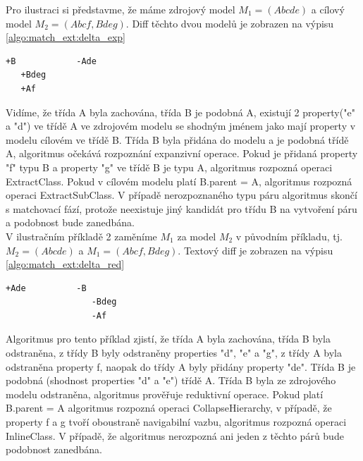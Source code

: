 \documentclass[11pt,twoside,a4paper]{book}
\begin{document}
 Pro ilustraci si představme, že máme zdrojový model $M_1 = (Abcde)$ a cílový
 model $M_2 = (Abcf, Bdeg)$. Diff těchto dvou modelů je zobrazen na výpisu
 \ref{algo:match_ext:delta_exp}

 \begin{lstlisting}[frame=single,caption=Textový diff pro
 expanzivní operaci,label=algo:match_ext:delta_exp]
   +B            -Ade
   +Bdeg          
   +Af
\end{lstlisting}
 
 Vidíme, že třída A byla zachována, třída B je podobná A, existují 2
 property("e" a "d") ve třídě A ve zdrojovém modelu se shodným jménem jako mají
 property v modelu cílovém ve třídě B. Třída B byla přidána do modelu a je
 podobná třídě A, algoritmus očekává rozpoznání expanzivní operace. Pokud je
 přidaná property "f" typu B a property "g" ve třídě B je typu A, algoritmus
 rozpozná operaci ExtractClass. Pokud v cílovém modelu platí B.parent = A,
 algoritmus rozpozná operaci ExtractSubClass.
 V případě nerozpoznaného typu páru algoritmus skončí s matchovací fází, protože
 neexistuje jiný kandidát pro třídu B na vytvoření páru a podobnost bude
 zanedbána.\\
 
 V ilustračním příkladě 2 zaměníme $M_1$
 za model $M_2$ v původním příkladu, tj. $M_2 = (Abcde)$ a $M_1 = (Abcf,
 Bdeg)$. Textový diff je zobrazen na výpisu \ref{algo:match_ext:delta_red}
 
  \begin{lstlisting}[frame=single,caption=Textový diff pro
 reduktivní operaci,label=algo:match_ext:delta_red]
   +Ade          -B            
                 -Bdeg          
                 -Af
\end{lstlisting}
 
 Algoritmus pro tento příklad zjistí, že třída A byla zachována, třída B byla
 odstraněna, z třídy B byly odstraněny properties "d", "e" a "g", z třídy A
 byla odstraněna property f, naopak do třídy A byly přidány property "de". Třída
 B je podobná (shodnost properties "d" a "e") třídě A. Třída B
 byla ze zdrojového modelu odstraněna, algoritmus prověřuje reduktivní operace.
 Pokud platí B.parent = A algoritmus rozpozná operaci CollapseHierarchy, v
 případě, že property f a g tvoří oboustraně navigabilní vazbu, algoritmus
 rozpozná operaci InlineClass. V případě, že algoritmus nerozpozná ani jeden z
 těchto párů bude podobnost zanedbána.
\end{document}
